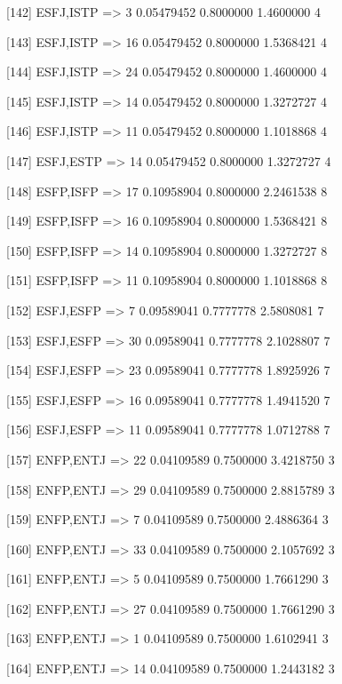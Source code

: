 [142] {ESFJ,ISTP}           => {3}  0.05479452 0.8000000  1.4600000  4   

[143] {ESFJ,ISTP}           => {16} 0.05479452 0.8000000  1.5368421  4   

[144] {ESFJ,ISTP}           => {24} 0.05479452 0.8000000  1.4600000  4   

[145] {ESFJ,ISTP}           => {14} 0.05479452 0.8000000  1.3272727  4   

[146] {ESFJ,ISTP}           => {11} 0.05479452 0.8000000  1.1018868  4   

[147] {ESFJ,ESTP}           => {14} 0.05479452 0.8000000  1.3272727  4   

[148] {ESFP,ISFP}           => {17} 0.10958904 0.8000000  2.2461538  8   

[149] {ESFP,ISFP}           => {16} 0.10958904 0.8000000  1.5368421  8   

[150] {ESFP,ISFP}           => {14} 0.10958904 0.8000000  1.3272727  8   

[151] {ESFP,ISFP}           => {11} 0.10958904 0.8000000  1.1018868  8   

[152] {ESFJ,ESFP}           => {7}  0.09589041 0.7777778  2.5808081  7   

[153] {ESFJ,ESFP}           => {30} 0.09589041 0.7777778  2.1028807  7   

[154] {ESFJ,ESFP}           => {23} 0.09589041 0.7777778  1.8925926  7   

[155] {ESFJ,ESFP}           => {16} 0.09589041 0.7777778  1.4941520  7   

[156] {ESFJ,ESFP}           => {11} 0.09589041 0.7777778  1.0712788  7   

[157] {ENFP,ENTJ}           => {22} 0.04109589 0.7500000  3.4218750  3   

[158] {ENFP,ENTJ}           => {29} 0.04109589 0.7500000  2.8815789  3   

[159] {ENFP,ENTJ}           => {7}  0.04109589 0.7500000  2.4886364  3   

[160] {ENFP,ENTJ}           => {33} 0.04109589 0.7500000  2.1057692  3   

[161] {ENFP,ENTJ}           => {5}  0.04109589 0.7500000  1.7661290  3   

[162] {ENFP,ENTJ}           => {27} 0.04109589 0.7500000  1.7661290  3   

[163] {ENFP,ENTJ}           => {1}  0.04109589 0.7500000  1.6102941  3   

[164] {ENFP,ENTJ}           => {14} 0.04109589 0.7500000  1.2443182  3   

